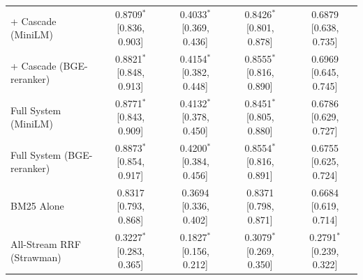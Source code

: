 \documentclass[conference]{IEEEtran}
\begin{document}
\begin{table}[t]
{\begin{tabular}{lcccc}
+ Cascade (MiniLM)              & 0.8709$^*$ [0.836, 0.903] & 0.4033$^*$ [0.369, 0.436] & 0.8426$^*$ [0.801, 0.878] & 0.6879 [0.638, 0.735] \\
+ Cascade (BGE-reranker)        & 0.8821$^*$ [0.848, 0.913] & 0.4154$^*$ [0.382, 0.448] & 0.8555$^*$ [0.816, 0.890] & 0.6969 [0.645, 0.745] \\
Full System (MiniLM)            & 0.8771$^*$ [0.843, 0.909] & 0.4132$^*$ [0.378, 0.450] & 0.8451$^*$ [0.805, 0.880] & 0.6786 [0.629, 0.727] \\
Full System (BGE-reranker)      & 0.8873$^*$ [0.854, 0.917] & 0.4200$^*$ [0.384, 0.456] & 0.8554$^*$ [0.816, 0.891] & 0.6755 [0.625, 0.724] \\
\midrule
BM25 Alone                      & 0.8317 [0.793, 0.868] & 0.3694 [0.336, 0.402] & 0.8371 [0.798, 0.871] & 0.6684 [0.619, 0.714] \\
All-Stream RRF (Strawman)       & 0.3227$^*$ [0.283, 0.365] & 0.1827$^*$ [0.156, 0.212] & 0.3079$^*$ [0.269, 0.350] & 0.2791$^*$ [0.239, 0.322] \\
\bottomrule
\end{tabular}}
\end{table}
\end{document}
